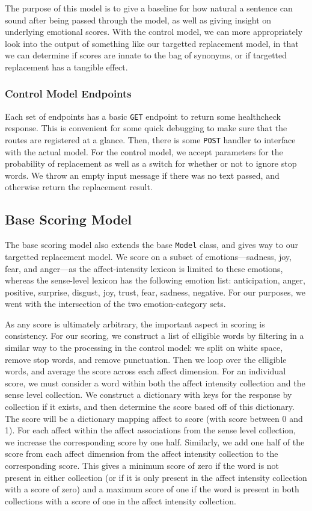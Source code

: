 \documentclass[11pt, twoside, reqno]{book}
\begin{document}
The purpose of this model is to give a baseline for how natural a sentence can sound after being passed through the model, as well as giving insight on underlying emotional scores. With the control model, we can more appropriately look into the output of something like our targetted replacement model, in that we can determine if scores are innate to the bag of synonyms, or if targetted replacement has a tangible effect.

\subsubsection{\textbf{Control Model Endpoints}}

Each set of endpoints has a basic \texttt{GET} endpoint to return some healthcheck response. This is convenient for some quick debugging to make sure that the routes are registered at a glance. Then, there is some \texttt{POST} handler to interface with the actual model. For the control model, we accept parameters for the probability of replacement as well as a switch for whether or not to ignore stop words. We throw an empty input message if there was no text passed, and otherwise return the replacement result.

\subsection{Base Scoring Model}

The base scoring model also extends the base \texttt{Model} class, and gives way to our targetted replacement model. We score on a subset of emotions—sadness, joy, fear, and anger—as the affect-intensity lexicon is limited to these emotions, whereas the sense-level lexicon has the following emotion list: anticipation, anger, positive, surprise, disgust, joy, trust, fear, sadness, negative. For our purposes, we went with the intersection of the two emotion-category sets.

As any score is ultimately arbitrary, the important aspect in scoring is consistency. For our scoring, we construct a list of elligible words by filtering in a similar way to the processing in the control model: we split on white space, remove stop words, and remove punctuation. Then we loop over the elligible words, and average the score across each affect dimension. For an individual score, we must consider a word within both the affect intensity collection and the sense level collection. We construct a dictionary with keys for the response by collection if it exists, and then determine the score based off of this dictionary. The score will be a dictionary mapping affect to score (with score between 0 and 1). For each affect within the affect associations from the sense level collection, we increase the corresponding score by one half. Similarly, we add one half of the score from each affect dimension from the affect intensity collection to the corresponding score. This gives a minimum score of zero if the word is not present in either collection (or if it is only present in the affect intensity collection with a score of zero) and a maximum score of one if the word is present in both collections with a score of one in the affect intensity collection.
\end{document}
